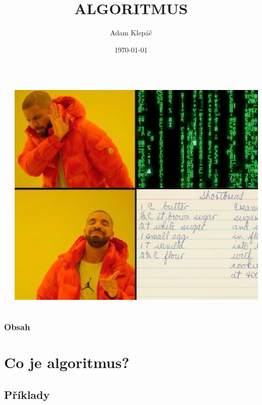 \documentclass[aspectratio=169,11pt]{beamer}
\title{ALGORITMUS}
\date{\today}
\author{Adam Klepáč}
\institute[GEVO]{Gymnázium Evolution Jižní Město}
\begin{document}
\begin{frame}
 \begin{columns}
  \begin{column}{.45\textwidth}
   \maketitle
  \end{column}
  \begin{column}{.45\textwidth}
   \includegraphics[width=\textwidth]{intro-meme}
  \end{column}
 \end{columns}
\end{frame}

\begin{frame}
 \frametitle{Obsah}
 \tableofcontents
\end{frame}

\section[Co je algoritmus?]{Co je algoritmus?}

\subsection[Příklady]{Příklady}
\end{document}
